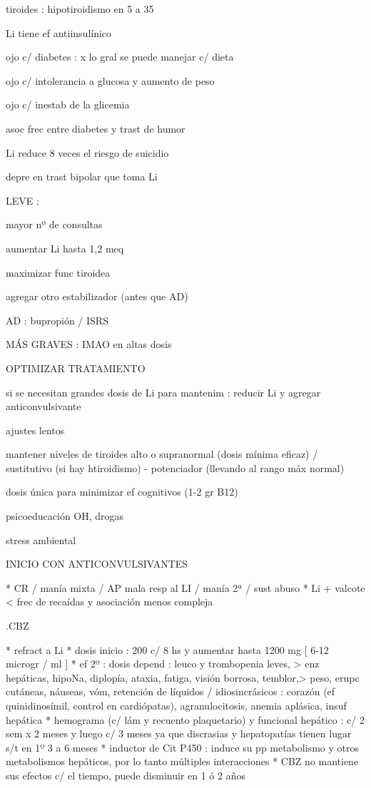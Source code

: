 tiroides : hipotiroidismo en 5 a 35%

Li tiene ef antiinsulínico

ojo c/ diabetes : x lo gral se puede manejar c/ dieta

ojo c/ intolerancia a glucosa y aumento de peso

ojo c/ inestab de la glicemia

asoc frec entre diabetes y trast de humor

Li reduce 8 veces el riesgo de suicidio

depre en trast bipolar que toma Li

LEVE :

mayor nº de consultas

aumentar Li hasta 1,2 meq

maximizar func tiroidea

agregar otro estabilizador (antes que AD)

AD : bupropión / ISRS

MÁS GRAVES : IMAO en altas dosis

OPTIMIZAR TRATAMIENTO

si se necesitan grandes dosis de Li para mantenim : reducir Li y agregar anticonvulsivante

ajustes lentos

mantener niveles de tiroides alto o supranormal (dosis mínima eficaz) / sustitutivo (si hay htiroidismo) - potenciador (llevando al rango máx normal)

dosis única para minimizar ef cognitivos (1-2 gr B12)

psicoeducación OH, drogas

stress ambiental

INICIO CON ANTICONVULSIVANTES

* CR / manía mixta / AP mala resp al LI / manía 2ª / sust abuso
* Li + valcote < frec de recaídas y asociación menos compleja

.CBZ

* refract a Li
* dosis inicio : 200 c/ 8 hs y aumentar hasta 1200 mg [ 6-12 microgr / ml ]
* ef 2º : dosis depend : leuco y trombopenia leves, > enz hepáticas, hipoNa, diplopía, ataxia, fatiga, visión borrosa, temblor,> peso, erupc cutáneas, náuseas, vóm, retención de líquidos / idiosincrásicos : corazón (ef quinidinosímil, control en cardiópatas), agranulocitosis, anemia aplásica, insuf hepática
* hemograma (c/ lám y recuento plaquetario) y funcional hepático : c/ 2 sem x 2 meses y luego c/ 3 meses ya que discrasias y hepatopatías tienen lugar s/t en 1º 3 a 6 meses
* inductor de Cit P450 : induce su pp metabolismo y otros metabolismos hepáticos, por lo tanto múltiples interacciones
* CBZ no mantiene sus efectos c/ el tiempo, puede disminuir en 1 ó 2 años


